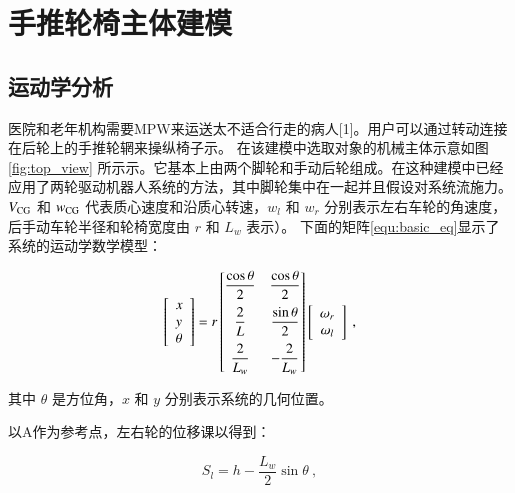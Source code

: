 \newpage
\section{手推轮椅主体建模}

\subsection{运动学分析}

	医院和老年机构需要MPW来运送太不适合行走的病人[1]。用户可以通过转动连接在后轮上的手推轮辋来操纵椅子示。
	在该建模中选取对象的机械主体示意如图 \ref{fig:top_view} 所示示。它基本上由两个脚轮和手动后轮组成。在这种建模中已经应用了两轮驱动机器人系统的方法，其中脚轮集中在一起并且假设对系统流施力。 
	$ V_{\rm{CG}} $ 和 $ w_{\rm{CG}} $ 代表质心速度和沿质心转速，$ w_l $ 和 $ w_r $ 分别表示左右车轮的角速度，后手动车轮半径和轮椅宽度由 $ r $ 和 $ L_w $ 表示）。
	下面的矩阵\ref{equ:basic_eq}显示了系统的运动学数学模型：
	
	\begin{equation}
	\label{equ:basic_eq}
	\begin{bmatrix} \begin{array}{l}{x} \\ {y} \\ {\theta}\end{array} \end{bmatrix}
	=
	r
	\begin{bmatrix}
		\vspace{0.2cm} {\dfrac{\cos \theta}{2}} & {\dfrac{\cos \theta}{2}} \\
		\vspace{0.2cm} {\dfrac{2}{L}} & {\dfrac{\sin \theta}{2}} \\
		{\dfrac{2}{L_w}} & - {\dfrac{2}{L_w}}
	\end{bmatrix}
	\begin{bmatrix} \begin{array}{c}{\omega_r} \\ {\omega_l}\end{array} \end{bmatrix}
	\ ,
	\end{equation}
	
	\noindent 其中 $ \theta $ 是方位角，$ x $ 和 $ y $ 分别表示系统的几何位置。
	
	以A作为参考点，左右轮的位移课以得到： 
	
	\begin{equation}
	\label{equ:left_s}
	S_l = h
	-
	\frac{L_w}{2} \sin \theta
	\ ,
	\end{equation}
	
